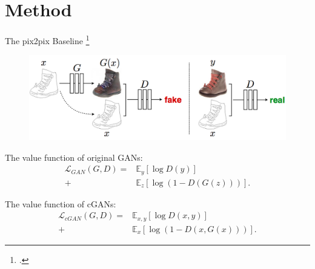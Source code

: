 \documentclass{beamer}
\begin{document}
\section{Method}
\begin{frame}{The pix2pix Baseline \footcite{Image-to-image translation with conditional adversarial networks (CVPR 2017)}}
	\begin{figure}
		\centering
		\includegraphics[height=0.3\textheight]{images/baseline}
	\end{figure}
%
%
\begin{beamerboxesrounded}[upper=uppercol,lower=lowercol,shadow=false]{The value function of original GANs:}
	\begin{equation}
	\begin{aligned}
	\mathcal{L}_{GAN}(G,D)=&\mathbb{E}_{y}[\log D(y)]\\+&\mathbb{E}_{z}[\log(1-D(G(z)))].
	\end{aligned}
	\end{equation}
\end{beamerboxesrounded}
%
%
\begin{beamerboxesrounded}[upper=uppercol,lower=lowercol,shadow=false]{The value function of cGANs:}
\begin{equation}
\begin{aligned}
	\mathcal{L}_{cGAN}(G,D)=&\mathbb{E}_{x,y}[\log D(x,y)]\\+&\mathbb{E}_{x}[\log(1-D(x,G(x)))].
\end{aligned}
\end{equation}
\end{beamerboxesrounded}
\end{frame}
\end{document}
